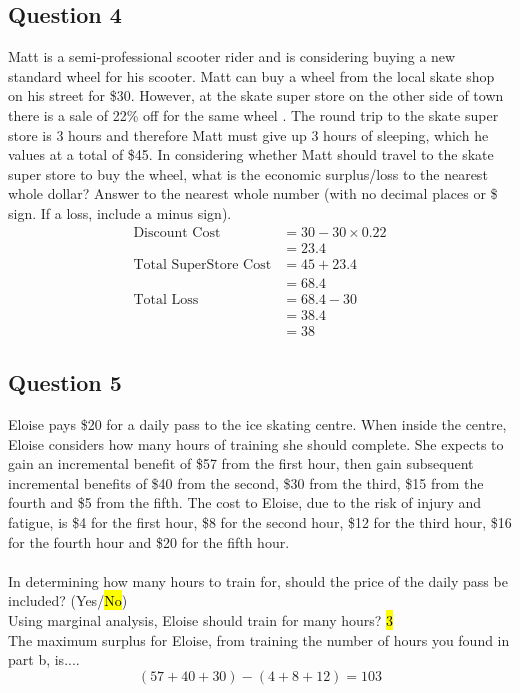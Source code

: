 \subsection{Question 4}
Matt is a semi-professional scooter rider and is considering buying a new standard wheel for his scooter. Matt can buy a wheel from the local skate shop on his street for \$30. However, at the skate super store on the other side of town there is a sale of 22\% off for the same wheel . The round trip to the skate super store is 3 hours and therefore Matt must give up 3 hours of sleeping, which he values at a total of \$45. In considering whether Matt should travel to the skate super store to buy the wheel, what is the economic surplus/loss to the nearest whole dollar? Answer to the nearest whole number (with no decimal places or \$ sign. If a loss, include a minus sign).
\begin{align*}
	\text{Discount Cost} &= 30 - 30\times0.22\\ &= 23.4\\
	\text{Total SuperStore Cost} &= 45 + 23.4\\ &= 68.4\\
	\text{Total Loss} &= 68.4 - 30\\ &= 38.4\\ &= 38 \tag{Rounded}
\end{align*}

\subsection{Question 5}
Eloise pays \$20 for a daily pass to the ice skating centre. When inside the centre, Eloise considers how many hours of training she should complete. She expects to gain an incremental benefit of \$57 from the first hour, then gain subsequent incremental benefits of \$40 from the second, \$30 from the third, \$15 from the fourth and \$5 from the fifth. The cost to Eloise, due to the risk of injury and fatigue, is \$4 for the first hour, \$8 for the second hour, \$12 for the third hour, \$16 for the fourth hour and \$20 for the fifth hour.\\\\
In determining how many hours to train for, should the price of the daily pass be included? (Yes/\hl{No})\\
Using marginal analysis, Eloise should train for many hours? \hl{3}\\
The maximum surplus for Eloise, from training the number of hours you found in part b, is....
\[
	(57 + 40 + 30) - (4 + 8 + 12) = 103
\]

